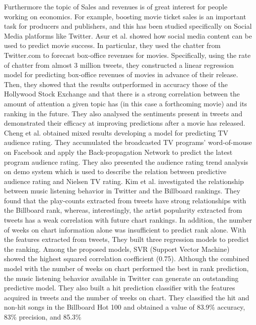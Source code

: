 \documentclass[]{book}
\begin{document}
Furthermore the topic of Sales and revenues is of great interest for
people working on economics. For example, boosting movie ticket sales is
an important task for producers and publishers, and this has been
studied specifically on Social Media platforms like Twitter. Asur et al.
\citep{asur2010predicting} showed how social media content can be used
to predict movie success. In particular, they used the chatter from
Twitter.com to forecast box-office revenues for movies. Specifically,
using the rate of chatter from almost 3 million tweets, they constructed
a linear regression model for predicting box-office revenues of movies
in advance of their release. Then, they showed that the results
outperformed in accuracy those of the Hollywood Stock Exchange and that
there is a strong correlation between the amount of attention a given
topic has (in this case a forthcoming movie) and its ranking in the
future. They also analysed the sentiments present in tweets and
demonstrated their efficacy at improving predictions after a movie has
released. Cheng et al. \citep{cheng2013predicting} obtained mixed
results developing a model for predicting TV audience rating. They
accumulated the broadcasted TV programs' word-of-mouse on Facebook and
apply the Back-propagation Network to predict the latest program
audience rating. They also presented the audience rating trend analysis
on demo system which is used to describe the relation between predictive
audience rating and Nielsen TV rating. Kim et al.
\citep{kim2014nowplaying} investigated the relationship between music
listening behavior in Twitter and the Billboard rankings. They found
that the play-counts extracted from tweets have strong relationships
with the Billboard rank, whereas, interestingly, the artist popularity
extracted from tweets has a weak correlation with future chart rankings.
In addition, the number of weeks on chart information alone was
insufficient to predict rank alone. With the features extracted from
tweets, They built three regression models to predict the ranking. Among
the proposed models, SVR (Support Vector Machine) showed the highest
squared correlation coefficient (0.75). Although the combined model with
the number of weeks on chart performed the best in rank prediction, the
music listening behavior available in Twitter can generate an
outstanding predictive model. They also built a hit prediction
classifier with the features acquired in tweets and the number of weeks
on chart. They classified the hit and non-hit songs in the Billboard Hot
100 and obtained a value of 83.9\% accuracy, 83\% precision, and 85.3\%
\end{document}
